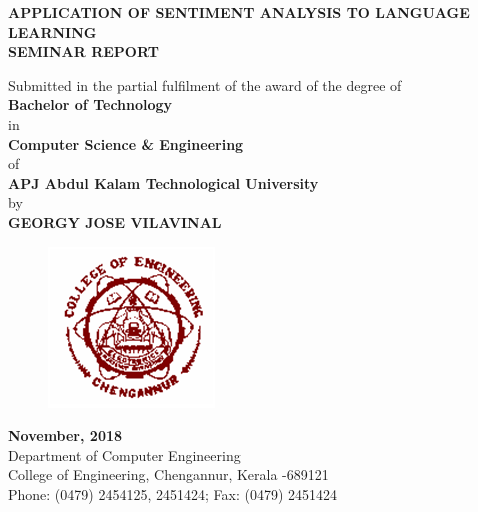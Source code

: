 \documentclass[a4paper,12pt,oneside]{article}
\begin{document}
\thispagestyle{empty}
\begin{center}

\large{\textbf{{APPLICATION OF SENTIMENT ANALYSIS TO LANGUAGE LEARNING}}}
\setlength{\baselineskip}{1.5\baselineskip}
\\
\vspace{5mm}
\textbf{SEMINAR REPORT}

Submitted in the partial fulfilment of the award of the degree
of
\\
\textbf{Bachelor of Technology}
\\
in
\\
\textbf{Computer Science \& Engineering}
\\
of
\\
\textbf{APJ Abdul Kalam Technological University}
\\
by
\\
\textbf{GEORGY JOSE VILAVINAL}
\\
\vspace{5mm}
\begin{figure}[H]
\centering
\includegraphics{ceclogo.png}
\end{figure}
\textbf{November, 2018}
\vspace{8mm}
\\
Department of Computer Engineering
\\
College of Engineering, Chengannur, Kerala -689121
\\
Phone: (0479) 2454125, 2451424; Fax: (0479) 2451424
\\
\end{center}
\end{document}
